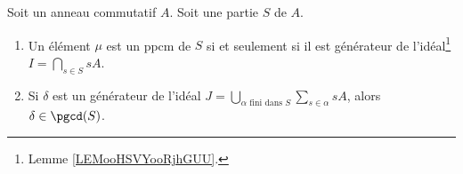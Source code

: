 \begin{proposition}	\label{PROPooMMHPooZYzvdK}
	Soit un anneau commutatif \( A\). Soit une partie \( S\) de \( A\).
	\begin{enumerate}
		\item		\label{ITEMooJKGMooCqWYOq}
		      Un élément \( \mu\) est un ppcm de \( S\) si et seulement si il est générateur de l'idéal\footnote{Lemme \ref{LEMooHSVYooRjhGUU}.} \( I=\bigcap_{s\in S}sA\).
		\item		\label{ITEMooZUCVooRIpnhU}
		      Si \( \delta\) est un générateur de l'idéal \( J=\bigcup_{\alpha\text{ fini dans }S}\sum_{s\in \alpha}sA\), alors \( \delta\in\pgcd(S)\).
	\end{enumerate}
\end{proposition}

